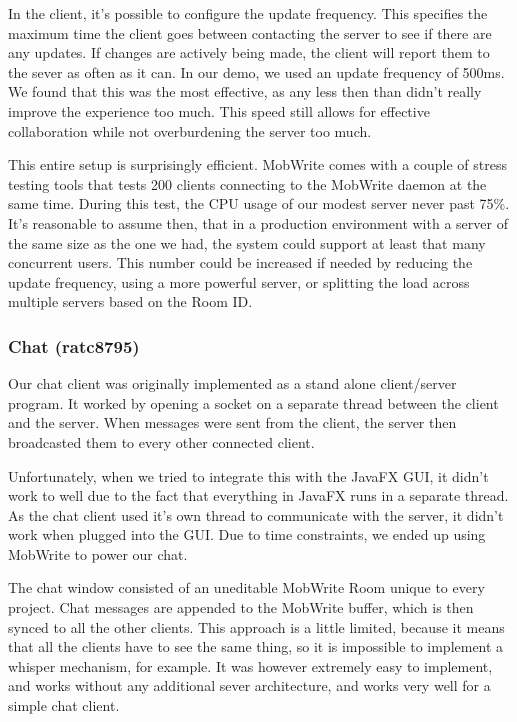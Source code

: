 \documentclass[twoside,letterpaper]{article}
\begin{document}
In the client, it's possible to configure the update frequency. This specifies the maximum time the client goes between contacting the server to see if there are any updates. If changes are actively being made, the client will report them to the sever as often as it can. In our demo, we used an update frequency of 500ms. We found that this was the most effective, as any less then than didn't really improve the experience too much. This speed still allows for effective collaboration while not overburdening the server too much.

This entire setup is surprisingly efficient. MobWrite comes with a couple of stress testing tools that tests 200 clients connecting to the MobWrite daemon at the same time. During this test, the CPU usage of our modest server never past 75\%. It's reasonable to assume then, that in a production environment with a server of the same size as the one we had, the system could support at least that many concurrent users. This number could be increased if needed by reducing the update frequency, using a more powerful server, or splitting the load across multiple servers based on the Room ID.

\subsubsection{Chat (ratc8795)}
Our chat client was originally implemented as a stand alone client/server program. It worked by opening a socket on a separate thread between the client and the server. When messages were sent from the client, the server then broadcasted them to every other connected client.

Unfortunately, when we tried to integrate this with the JavaFX GUI, it didn't work to well due to the fact that everything in JavaFX runs in a separate thread. As the chat client used it's own thread to communicate with the server, it didn't work when plugged into the GUI. Due to time constraints, we ended up using MobWrite to power our chat.

The chat window consisted of an uneditable MobWrite Room unique to every project. Chat messages are appended to the MobWrite buffer, which is then synced to all the other clients. This approach is a little limited, because it means that all the clients have to see the same thing, so it is impossible to implement a whisper mechanism, for example. It was however extremely easy to implement, and works without any additional sever architecture, and works very well for a simple chat client.
\end{document}
